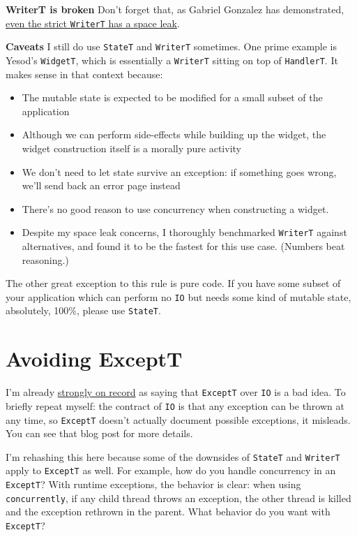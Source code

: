 \textbf{WriterT is broken} Don't forget that, as Gabriel Gonzalez has
demonstrated,
\href{https://mail.haskell.org/pipermail/libraries/2012-October/018599.html}{even
the strict \texttt{WriterT} has a space leak}.

\textbf{Caveats} I still do use \texttt{StateT} and \texttt{WriterT}
sometimes. One prime example is Yesod's \texttt{WidgetT}, which is
essentially a \texttt{WriterT} sitting on top of \texttt{HandlerT}. It
makes sense in that context because:

\begin{itemize}

\item
  The mutable state is expected to be modified for a small subset of the
  application
\item
  Although we can perform side-effects while building up the widget, the
  widget construction itself is a morally pure activity
\item
  We don't need to let state survive an exception: if something goes
  wrong, we'll send back an error page instead
\item
  There's no good reason to use concurrency when constructing a widget.
\item
  Despite my space leak concerns, I thoroughly benchmarked
  \texttt{WriterT} against alternatives, and found it to be the fastest
  for this use case. (Numbers beat reasoning.)
\end{itemize}
The other great exception to this rule is pure code. If you have some
subset of your application which can perform no \texttt{IO} but needs
some kind of mutable state, absolutely, 100\%, please use
\texttt{StateT}.

\section{Avoiding ExceptT}

I'm already
\href{https://www.fpcomplete.com/blog/2016/11/exceptions-best-practices-haskell}{strongly
on record} as saying that \texttt{ExceptT} over \texttt{IO} is a bad
idea. To briefly repeat myself: the contract of \texttt{IO} is that any
exception can be thrown at any time, so \texttt{ExceptT} doesn't
actually document possible exceptions, it misleads. You can see that
blog post for more details.

I'm rehashing this here because some of the downsides of \texttt{StateT}
and \texttt{WriterT} apply to \texttt{ExceptT} as well. For example, how
do you handle concurrency in an \texttt{ExceptT}? With runtime
exceptions, the behavior is clear: when using \texttt{concurrently}, if
any child thread throws an exception, the other thread is killed and the
exception rethrown in the parent. What behavior do you want with
\texttt{ExceptT}?


